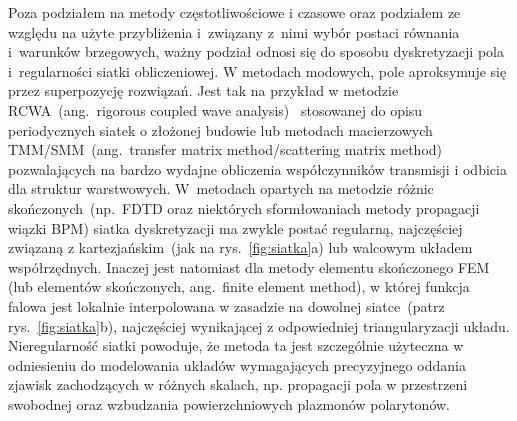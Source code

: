 Poza podziałem na metody częstotliwościowe i czasowe oraz podziałem ze względu na użyte przybliżenia i~związany z~nimi wybór postaci równania i~warunków brzegowych, ważny podział odnosi się do sposobu dyskretyzacji pola i~regularności siatki obliczeniowej. W metodach modowych, pole aproksymuje się przez superpozycję rozwiązań. Jest tak na przykład w metodzie RCWA~(ang.~rigorous coupled wave analysis)~\cite{hench2008rcwa} stosowanej do opisu periodycznych siatek o złożonej budowie lub metodach macierzowych TMM/SMM~(ang.~transfer matrix method/scattering matrix method)~\cite{teich1991fundamentalsTMM,yeh2006} pozwalających na bardzo wydajne obliczenia współczynników transmisji i odbicia dla struktur warstwowych. W~metodach opartych na metodzie różnic skończonych~(np.~FDTD oraz niektórych sformłowaniach metody propagacji wiązki BPM) siatka dyskretyzacji ma zwykle postać regularną, najczęściej związaną z kartezjańskim~(jak na rys.~\ref{fig:siatka}a) lub walcowym układem współrzędnych. Inaczej jest natomiast dla metody elementu skończonego FEM (lub elementów skończonych, ang.~finite element method), w której funkcja falowa jest lokalnie interpolowana w zasadzie na dowolnej siatce~(patrz rys.~\ref{fig:siatka}b), najczęściej wynikającej z odpowiedniej triangularyzacji układu. Nieregularność siatki powoduje, że metoda ta jest szczególnie użyteczna w odniesieniu do modelowania układów wymagających precyzyjnego oddania zjawisk zachodzących w różnych skalach, np. propagacji pola w przestrzeni swobodnej oraz wzbudzania powierzchniowych plazmonów polarytonów.

